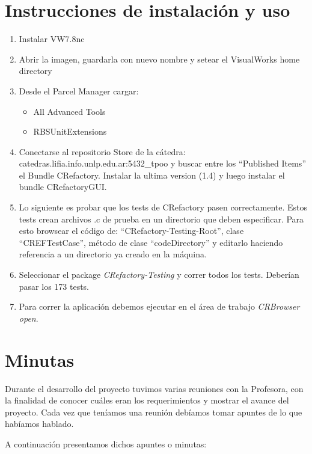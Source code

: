 \documentclass[a4paper,oneside,12pt]{article}
\begin{document}
\section{Instrucciones de instalaci\'on y uso}

\begin{enumerate}
\item Instalar VW7.8nc
\item Abrir la imagen, guardarla con nuevo nombre y setear el VisualWorks home directory

\item Desde el Parcel Manager cargar:
  \begin{itemize}
  \item All Advanced Tools
  \item RBSUnitExtensions
  \end{itemize}
  
\item Conectarse al repositorio Store de la c\'atedra: catedras.lifia.info.unlp.edu.ar:5432\_tpoo y buscar entre los “Published Items” el Bundle CRefactory. Instalar la ultima version (1.4) y luego instalar el bundle CRefactoryGUI.

\item Lo siguiente es probar que los tests de CRefactory pasen correctamente. Estos tests crean archivos .c de prueba en un directorio que deben especificar. Para esto browsear el c\'odigo de: “CRefactory-Testing-Root”, clase “CREFTestCase”, m\'etodo de clase “codeDirectory” y editarlo haciendo referencia a un directorio ya creado en la m\'aquina.
  
\item Seleccionar el package {\it CRefactory-Testing} y correr todos los tests. Deber\'ian pasar los 173 tests.

\item Para correr la aplicaci\'on debemos ejecutar en el \'area de trabajo  {\it CRBrowser open}. 
\end{enumerate}

\section{Minutas}
Durante el desarrollo del proyecto tuvimos varias reuniones con la Profesora, con la finalidad de conocer cu\'ales eran los requerimientos y mostrar el avance del proyecto. Cada vez que ten\'iamos una reuni\'on deb\'iamos tomar apuntes de lo que hab\'iamos hablado.

A continuaci\'on presentamos dichos apuntes o minutas:
\end{document}
